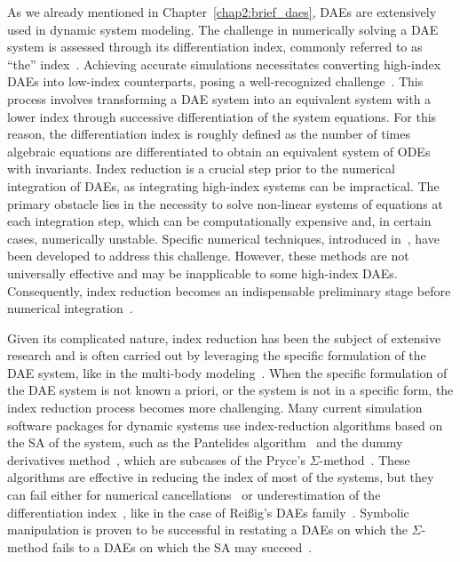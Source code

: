 As we already mentioned in Chapter~\ref{chap2:brief_daes}, \acp{DAE} are extensively used in dynamic system modeling. The challenge in numerically solving a \ac{DAE} system is assessed through its differentiation index, commonly referred to as ``the'' index~\cite{campbell1995index, campbell1995highindex}. Achieving accurate simulations necessitates converting high-index \acp{DAE} into low-index counterparts, posing a well-recognized challenge~\cite{petzold1982differential}. This process involves transforming a \ac{DAE} system into an equivalent system with a lower index through successive differentiation of the system equations. For this reason, the differentiation index is roughly defined as the number of times algebraic equations are differentiated to obtain an equivalent system of \acp{ODE} with invariants. Index reduction is a crucial step prior to the numerical integration of \acp{DAE}, as integrating high-index systems can be impractical. The primary obstacle lies in the necessity to solve non-linear systems of equations at each integration step, which can be computationally expensive and, in certain cases, numerically unstable. Specific numerical techniques, introduced in~\cite{petzold1982differential, thomsen1999numerical, baumgarte1972stabilization}, have been developed to address this challenge. However, these methods are not universally effective and may be inapplicable to some high-index \acp{DAE}. Consequently, index reduction becomes an indispensable preliminary stage before numerical integration~\cite{lamour2013differential}.

Given its complicated nature, index reduction has been the subject of extensive research and is often carried out by leveraging the specific formulation of the \ac{DAE} system, like in the multi-body modeling~\cite{zhou2005implicit, zhou2007symbolic, zhou2007symbolicseq, bayo1988modified, wehage1982generalized}. When the specific formulation of the \ac{DAE} system is not known a priori, or the system is not in a specific form, the index reduction process becomes more challenging. Many current simulation software packages for dynamic systems use index-reduction algorithms based on the \ac{SA} of the system, such as the Pantelides algorithm~\cite{pantelides1988consistent} and the dummy derivatives method~\cite{mattsson1993index}, which are subcases of the Pryce's $\Sigma$-method~\cite{pryce1998solving, pryce2001simple, nedialkov2007solvingI, nedialkov2007solvingII, nedialkov2008solvingIII, nedialkov2015algorithm, tan2016symbolic, mckenzie2017structural}. These algorithms are effective in reducing the index of most of the systems, but they can fail either for numerical cancellations~\cite{iwata2019index} or underestimation of the differentiation index~\cite{pantelides1988consistent, unger1995structural}, like in the case of Rei{\ss}ig's \acp{DAE} family~\cite{reissig2000differential}. Symbolic manipulation is proven to be successful in restating a \acp{DAE} on which the $\Sigma$-method fails to a \acp{DAE} on which the \ac{SA} may succeed~\cite{tan2016symbolic}.

